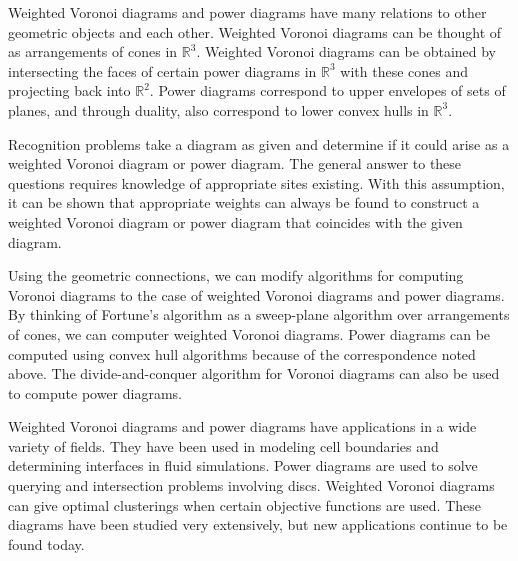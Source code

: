 \documentclass[a4paper, 11pt]{article}
\newcommand{\R}{\mathbb{R}}
\begin{document}
Weighted Voronoi diagrams and power diagrams have many relations to other geometric objects and each other. Weighted Voronoi diagrams can be thought
of as arrangements of cones in $\R^3$. Weighted Voronoi diagrams can be obtained
by intersecting the faces of certain power diagrams in $\R^3$ with these cones and projecting back into $\R^2$. Power diagrams correspond to upper
envelopes of sets of planes, and through duality, also correspond to lower convex hulls in $\R^3$.

Recognition problems take a diagram as given and determine if it could arise as a weighted Voronoi diagram or power diagram. The general answer to
these questions requires knowledge of appropriate sites existing. With this assumption, it can be shown that appropriate weights can always be found
to construct a weighted Voronoi diagram or power diagram that coincides with the given diagram.

Using the geometric connections, we can modify algorithms for computing Voronoi diagrams to the case of weighted Voronoi diagrams and power
diagrams. By thinking of Fortune's algorithm as a sweep-plane algorithm over arrangements of cones, we can computer weighted Voronoi diagrams. Power
diagrams can be computed using convex hull algorithms because of the correspondence noted above. The divide-and-conquer algorithm for Voronoi diagrams
can also be used to compute power diagrams.

Weighted Voronoi diagrams and power diagrams have applications in a wide variety of fields. They have been used in modeling cell boundaries and
determining interfaces in fluid simulations. Power diagrams are used to solve querying and intersection problems involving discs. Weighted Voronoi
diagrams can give optimal clusterings when certain objective functions are used. These diagrams have been studied very extensively, but new
applications continue to be found today.

\printbibliography
\end{document}
